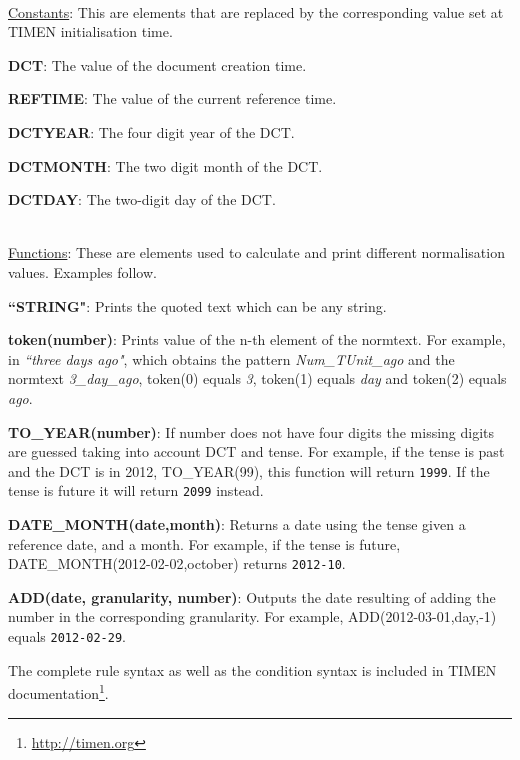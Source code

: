 \documentclass[10pt, a4paper]{article}
\begin{document}
\ \\
\underline{Constants}: This are elements that are replaced by the corresponding value set at TIMEN initialisation time.

\begin{itemize*}
\item \textbf{DCT}: The value of the document creation time.
\item \textbf{REFTIME}: The value of the current reference time.
\item \textbf{DCTYEAR}: The four digit year of the DCT.
\item \textbf{DCTMONTH}: The two digit month of the DCT.
\item \textbf{DCTDAY}: The two-digit day of the DCT.
\end{itemize*}

\ \\
\underline{Functions}: These are elements used to calculate and print different normalisation values. Examples follow.

\begin{itemize*}
\item \textbf{``STRING"}: Prints the quoted text which can be any string. 
\item \textbf{token(number)}: Prints value of the n-th element of the normtext. For example, in \textit{``three days ago"}, which obtains the pattern \textit{Num\_TUnit\_ago} and the normtext \textit{3\_day\_ago}, token(0) equals \textit{3}, token(1) equals \textit{day} and token(2) equals \textit{ago}.
\item \textbf{TO\_YEAR(number)}: If number does not have four digits the missing digits are guessed taking into account DCT and tense. For example, if the tense is past and the DCT is in 2012, TO\_YEAR(99), this function will return \texttt{1999}. If the tense is future it will return \texttt{2099} instead.
\item \textbf{DATE\_MONTH(date,month)}: Returns a date using the tense given a reference date, and a month. For example, if the tense is future, DATE\_MONTH(2012-02-02,october) returns \texttt{2012-10}.
\item \textbf{ADD(date, granularity, number)}: Outputs the date resulting of adding the number in the corresponding granularity. For example, ADD(2012-03-01,day,-1) equals \texttt{2012-02-29}. 
\end{itemize*}

The complete rule syntax as well as the condition syntax is included in TIMEN documentation\footnote{\scriptsize \url{http://timen.org}}.
\end{document}
